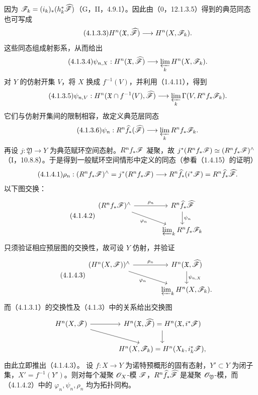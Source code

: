 因为 $\mathscr F_k=(i_k)_*(h_k^*\widehat{\mathscr F})$（G，II，4.9.1）。因此由（0，12.1.3.5）得到的典范同态也可写成
\begin{equation}\tag{4.1.3.3}H^n(\mathfrak X,\widehat{\mathscr F})\longrightarrow H^n(X,\mathscr F_k).\end{equation}
这些同态组成射影系，从而给出
\begin{equation}\tag{4.1.3.4}
\psi_{n,X}:H^n(\mathfrak X,\widehat{\mathscr F})\longrightarrow\varprojlim_kH^n(X,\mathscr F_k).
\end{equation}
对 $Y$ 的仿射开集 $V$，将 $X$ 换成 $f^{-1}(V)$，并利用（1.4.11），得到
\begin{equation}\tag{4.1.3.5}
\psi_{n,V}:H^n(\mathfrak X\cap f^{-1}(V),\widehat{\mathscr F})
\longrightarrow\varprojlim_k\Gamma(V,R^nf_*\mathscr F_k).
\end{equation}
它们与仿射开集间的限制相容，故定义典范层同态
\begin{equation}\tag{4.1.3.6}
\psi_n:R^n\widehat f_*(\widehat{\mathscr F})\longrightarrow\varprojlim_kR^nf_*\mathscr F_k.
\end{equation}
再设 $j:\mathfrak Y\to Y$ 为典范赋环空间态射。$R^nf_*\mathscr F$ 凝聚，故 $j^*(R^nf_*\mathscr F)\simeq(R^nf_*\mathscr F)^\wedge$（I，10.8.8）。于是得到一般赋环空间情形中定义的同态（参看（1.4.15）的证明）
\begin{equation}\tag{4.1.4.1}
\rho_n:(R^nf_*\mathscr F)^\wedge=j^*(R^nf_*\mathscr F)
\longrightarrow R^n\widehat f_*(i^*\mathscr F)=R^n\widehat f_*\widehat{\mathscr F}.
\end{equation}
以下图交换：
\begin{equation}\tag{4.1.4.2}
\begin{tikzcd}[column sep=large]
(R^nf_*\F)^\wedge\arrow[r,"\rho_n"]\arrow[dr,"\varphi_n"']&R^n\widehat f_*\widehat\F\arrow[d,"\psi_n"]\\
&\plim_kR^nf_*\F_k
\end{tikzcd}
\end{equation}
只须验证相应预层图的交换性，故可设 $Y$ 仿射，并验证
\begin{equation}\tag{4.1.4.3}
\begin{tikzcd}[column sep=large]
(H^n(X,\F))^\wedge\arrow[r,"\rho_n"]\arrow[dr,"\varphi_n"']&H^n(\mathfrak X,\widehat\F)\arrow[d,"\psi_{n,X}"]\\
&\plim_kH^n(X,\F_k).
\end{tikzcd}
\end{equation}
而（4.1.3.1）的交换性及（4.1.3）中的关系给出交换图
\[
\begin{tikzcd}[column sep=large]
H^n(X,\F)\arrow[r]\arrow[dr]&H^n(\mathfrak X,\widehat\F)=H^n(\mathfrak X,i^*\F)\arrow[d]\\
&H^n(X,\F_k)=H^n(X_k,i_k^*\F),
\end{tikzcd}
\]
由此立即推出（4.1.4.3）。
设 $f:X\to Y$ 为诺特预概形的固有态射，$Y'\subset Y$ 为闭子集，$X'=f^{-1}(Y')$。则对每个凝聚 $\mathscr O_X$-模 $\mathscr F$，$R^n\widehat f_*\widehat{\mathscr F}$ 是凝聚 $\mathscr O_{\mathfrak Y}$-模，而（4.1.4.2）中的 $\varphi_n,\psi_n,\rho_n$ 均为拓扑同构。

